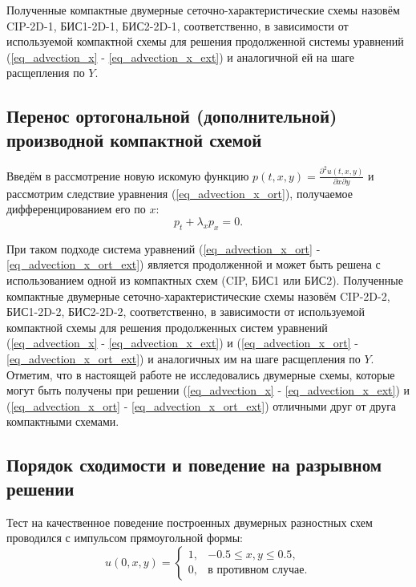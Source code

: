 \documentclass[11pt]{article}
\begin{document}
Полученные компактные двумерные сеточно-характеристические схемы назовём CIP-2D-1, БИС1-2D-1, БИС2-2D-1, соответственно, в зависимости от используемой компактной схемы для решения продолженной системы уравнений (\ref{eq_advection_x} - \ref{eq_advection_x_ext}) и аналогичной ей на шаге расщепления по $Y$.

\subsection{Перенос ортогональной (дополнительной) производной компактной схемой}

Введём в рассмотрение новую искомую функцию $p(t, x, y) = \frac{\partial^2 u(t, x, y)}{\partial x \partial y}$ и рассмотрим следствие уравнения (\ref{eq_advection_x_ort}), получаемое дифференцированием его по $x$:
\begin{equation}
\label{eq_advection_x_ort_ext}
p_t + \lambda_x p_x = 0.
\end{equation}

При таком подходе система уравнений (\ref{eq_advection_x_ort} - \ref{eq_advection_x_ort_ext}) является продолженной и может быть решена с использованием одной из компактных схем (CIP, БИС1 или БИС2).
Полученные компактные двумерные сеточно-характеристические схемы назовём CIP-2D-2, БИС1-2D-2, БИС2-2D-2, соответственно, в зависимости от используемой компактной схемы для решения продолженных систем уравнений (\ref{eq_advection_x} - \ref{eq_advection_x_ext}) и  (\ref{eq_advection_x_ort} - \ref{eq_advection_x_ort_ext}) и аналогичных им на шаге расщепления по $Y$.
Отметим, что в настоящей работе не исследовались двумерные схемы, которые могут быть получены при решении (\ref{eq_advection_x} - \ref{eq_advection_x_ext}) и  (\ref{eq_advection_x_ort} - \ref{eq_advection_x_ort_ext}) отличными друг от друга компактными схемами.

\subsection{Порядок сходимости и поведение на разрывном решении}

Тест на качественное поведение построенных двумерных разностных схем проводился с импульсом прямоугольной формы:
\begin{equation}
\label{eq_impulse_2d}
u(0, x, y) = 
\begin{cases}
1, & -0.5 \le x, y \le 0.5, \\
0, & \mbox{в противном случае}.
\end{cases}
\end{equation}
\end{document}

